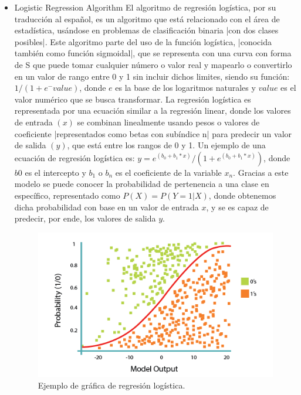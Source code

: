 \documentclass[spanish,12pt,letterpaper]{article}
\begin{document}
\begin{itemize}
    \item Logistic Regression Algorithm
    El algoritmo de regresión logística, por su traducción al español, es un algoritmo que está relacionado con el área de estadística, usándose en problemas de clasificación binaria |con dos clases posibles|. Este algoritmo parte del uso de la función logística, |conocida también como función sigmoidal|, que se representa con una curva con forma de S que puede tomar cualquier número o valor real y mapearlo o convertirlo en un valor de rango entre 0 y 1 sin incluir dichos limites, siendo su función: $1 / (1 + e^-value)$, donde $e$ es la base de los logaritmos naturales y $value$ es el valor numérico que se busca transformar.
    La regresión logística es representada por una ecuación similar a la regresión linear, donde los valores de entrada $(x)$ se combinan linealmente usando pesos o valores de coeficiente |representados como betas con subíndice n| para predecir un valor de salida $(y)$, que está entre los rangos de 0 y 1. Un ejemplo de una ecuación de regresión logística es: $y = e^(b_0 + b_1*x) / (1 + e^(b_0 + b_1*x))$, donde $b0$ es el intercepto y $b_1$ o $b_n$ es el coeficiente de la variable $x_n$. Gracias a este modelo se puede conocer la probabilidad de pertenencia a una clase en específico, representado como $P(X) = P(Y=1|X)$, donde obtenemos dicha probabilidad con base en un valor de entrada $x$, y se es capaz de predecir, por ende, los valores de salida $y$.
    \begin{figure}[H]
        \centering
        \includegraphics[width=1\columnwidth]{Regresion_Logistica.png}
        \caption{Ejemplo de gráfica de regresión logística.}
        \label{fig:comand}%
    \end{figure}
    

\end{itemize}
\end{document}
